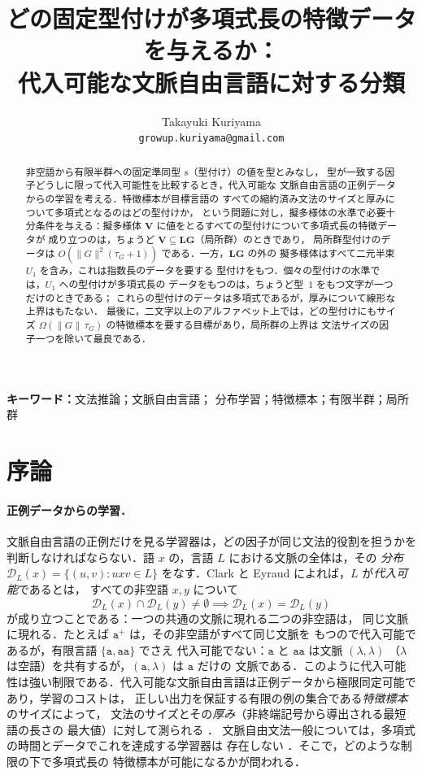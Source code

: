 \documentclass[11pt,a4paper]{ltjsarticle}
\title{どの固定型付けが多項式長の特徴データを与えるか：\\
代入可能な文脈自由言語に対する分類}
\author{Takayuki Kuriyama\\
\texttt{growup.kuriyama@gmail.com}}
\date{}
\numberwithin{equation}{section}
\theoremstyle{plain}
\theoremstyle{definition}
\theoremstyle{remark}
\theoremstyle{plain}
\newcommand{\D}{\mathcal{D}}
\newcommand{\LG}{\mathbf{LG}}
\begin{document}
\maketitle

\begin{abstract}
非空語から有限半群への固定準同型 $s$（型付け）の値を型とみなし，
型が一致する因子どうしに限って代入可能性を比較するとき，代入可能な
文脈自由言語の正例データからの学習を考える．特徴標本が目標言語の
すべての縮約済み文法のサイズと厚みについて多項式となるのはどの型付けか，
という問題に対し，擬多様体の水準で必要十分条件を与える：擬多様体
$\mathbf V$ に値をとるすべての型付けについて多項式長の特徴データが
成り立つのは，ちょうど $\mathbf V\subseteq\LG$（局所群）のときであり，
局所群型付けのデータは $O(\|G\|^2(\tau_G+1))$ である．一方，$\LG$ の外の
擬多様体はすべて二元半束 $U_1$ を含み，これは指数長のデータを要する
型付けをもつ．個々の型付けの水準では，$U_1$ への型付けが多項式長の
データをもつのは，ちょうど型~$1$ をもつ文字が一つだけのときである；
これらの型付けのデータは多項式であるが，厚みについて線形な上界はもたない．
最後に，二文字以上のアルファベット上では，どの型付けにもサイズ
$\Omega(\|G\|\,\tau_G)$ の特徴標本を要する目標があり，局所群の上界は
文法サイズの因子一つを除いて最良である．
\end{abstract}

\noindent\textbf{キーワード：}文法推論；文脈自由言語；
分布学習；特徴標本；有限半群；局所群

\section{序論}
\label{sec:introduction}

\paragraph{正例データからの学習．}
文脈自由言語の正例だけを見る学習器は，どの因子が同じ文法的役割を担うかを
判断しなければならない．語 $x$ の，言語 $L$ における文脈の全体は，その
\emph{分布} $\D_L(x)=\{(u,v):uxv\in L\}$ をなす．Clark と Eyraud
\cite{ClarkEyraud2007} によれば，$L$ が\emph{代入可能}であるとは，
すべての非空語 $x,y$ について
\[
 \D_L(x)\cap\D_L(y)\ne\emptyset \implies \D_L(x)=\D_L(y)
\]
が成り立つことである：一つの共通の文脈に現れる二つの非空語は，
同じ文脈に現れる．たとえば $\mathtt a^+$ は，その非空語がすべて同じ文脈を
もつので代入可能であるが，有限言語 $\{\mathtt a,\mathtt{aa}\}$ でさえ
代入可能でない：$\mathtt a$ と $\mathtt{aa}$ は文脈 $(\lambda,\lambda)$
（$\lambda$ は空語）を共有するが，$(\mathtt a,\lambda)$ は $\mathtt a$ だけの
文脈である．このように代入可能性は強い制限である．代入可能な文脈自由言語は正例データから極限同定可能であり，学習のコストは，
正しい出力を保証する有限の例の集合である\emph{特徴標本}のサイズによって，
文法のサイズとその\emph{厚み}（非終端記号から導出される最短語の長さの
最大値）に対して測られる \cite{ClarkEyraud2007,Yoshinaka2008}．
文脈自由文法一般については，多項式の時間とデータでこれを達成する学習器は
存在しない \cite{delaHiguera1997}．そこで，どのような制限の下で多項式長の
特徴標本が可能になるかが問われる．
\end{document}
